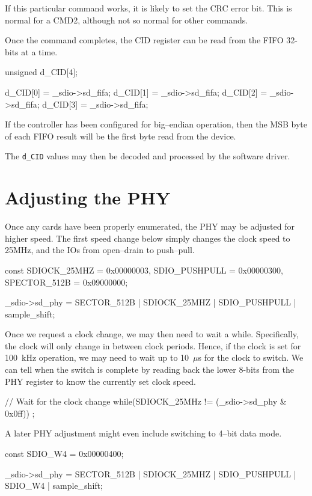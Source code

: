 \documentclass{gqtekspec}
\begin{document}
If this particular command works, it is likely to set the CRC error bit.
This is normal for a CMD2, although not so normal for other commands.

Once the command completes, the CID register can be read from the FIFO
32-bits at a time.

\begin{zCpp}
	unsigned	d_CID[4];

	d_CID[0] = _sdio->sd_fifa;
	d_CID[1] = _sdio->sd_fifa;
	d_CID[2] = _sdio->sd_fifa;
	d_CID[3] = _sdio->sd_fifa;
\end{zCpp}

If the controller has been configured for big--endian operation, then
the MSB byte of each FIFO result will be the first byte read from the
device.

The {\tt d\_CID} values may then be decoded and processed by the software
driver.
\section{Adjusting the PHY}
Once any cards have been properly enumerated, the PHY may be adjusted
for higher speed.  The first speed change below simply changes the clock
speed to 25MHz, and the IOs from open--drain to push--pull.

\begin{zCpp}
	const	SDIOCK_25MHZ  = 0x00000003,
		SDIO_PUSHPULL = 0x00000300,
		SPECTOR_512B  = 0x09000000;

	_sdio->sd_phy = SECTOR_512B | SDIOCK_25MHZ | SDIO_PUSHPULL
			| sample_shift;
\end{zCpp}

Once we request a clock change, we may then need to wait a while.  Specifically,
the clock will only change in between clock periods.  Hence, if the clock is
set for 100~kHz operation, we may need to wait up to 10~$\mu$s for the clock
to switch.  We can tell when the switch is complete by reading back the lower
8-bits from the PHY register to know the currently set clock speed.

\begin{zCpp}
	// Wait for the clock change
	while(SDIOCK_25MHz != (_sdio->sd_phy & 0x0ff))
		;
\end{zCpp}

A later PHY adjustment might even include switching to 4--bit data mode.

\begin{zCpp}
	const	SDIO_W4 = 0x00000400;

	_sdio->sd_phy = SECTOR_512B | SDIOCK_25MHZ | SDIO_PUSHPULL
				| SDIO_W4 | sample_shift;
\end{zCpp}
\end{document}
